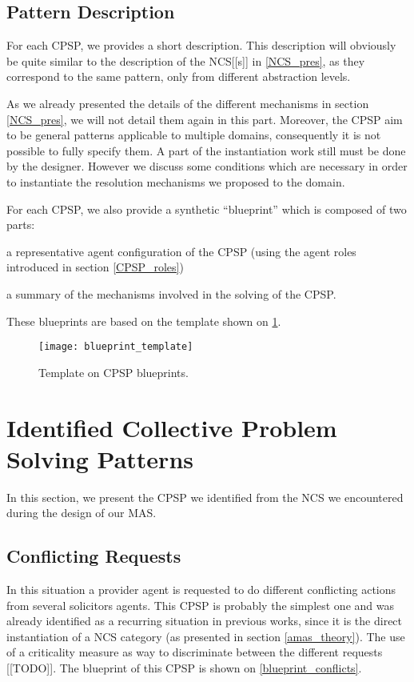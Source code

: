 \subsection{Pattern Description}

For each CPSP, we provides a short description. This description will obviously be quite similar to the description of the NCS[[s]] in \ref{NCS_pres}, as they correspond to the same pattern, only from different abstraction levels.

As we already presented the details of the different mechanisms in section \ref{NCS_pres}, we will not detail them again in this part. Moreover, the CPSP aim to be general patterns applicable to multiple domains, consequently it is not possible to fully specify them. A part of the instantiation work still must be done by the designer. However we discuss some conditions which are necessary in order to instantiate the resolution mechanisms we proposed to the domain.

For each CPSP, we also provide a synthetic \enquote{blueprint} which is composed of two parts:
\begin{compactenum}
\item a representative agent configuration of the CPSP (using the agent roles introduced in section \ref{CPSP_roles}) 
\item a summary of the mechanisms involved in the solving of the CPSP.
\end{compactenum}
These blueprints are based on the template shown on \figurename{} \ref{blueprint_template}.

\begin{figure}
\centering
\texttt{[image: blueprint\_template]}
\caption{Template on CPSP blueprints.}\label{blueprint_template}
\end{figure}

\section{Identified Collective Problem Solving Patterns}

In this section, we present the CPSP we identified from the NCS we encountered during the design of our MAS.

\subsection{Conflicting Requests}

In this situation a provider agent is requested to do different conflicting actions from several solicitors agents. This CPSP is probably the simplest one and was already identified as a recurring situation in previous works, since it is the direct instantiation of a NCS category (as presented in section \ref{amas_theory}). The use of a criticality measure as way to discriminate between the different requests [[TODO]].
The blueprint of this CPSP is shown on \figurename{} \ref{blueprint_conflicts}.

